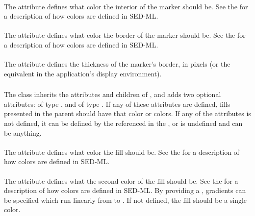 \begin{blockChanged}
\paragraph*{}

The  attribute defines what color the interior of the marker should be.  See the \ColorKind for a description of how colors are defined in SED-ML.

\paragraph*{}

The  attribute defines what color the border of the marker should be.  See the \ColorKind for a description of how colors are defined in SED-ML.

\paragraph*{}

The  attribute defines the thickness of the marker's border, in pixels (or the equivalent in the application's display environment).



\subsubsection{}
\label{class:fill}

The \Fill class inherits the attributes and children of \SedBase, and adds two optional attributes:  of type \ColorKind, and  of type \ColorKind.  If any of these attributes are defined, fills presented in the parent \Style should have that color or colors.  If any of the attributes is not defined, it can be defined by the \Style referenced in the , or is undefined and can be anything.

\paragraph*{}

The  attribute defines what color the fill should be.  See the \ColorKind for a description of how colors are defined in SED-ML.

\paragraph*{}

The  attribute defines what the second color of the fill should be.  See the \ColorKind for a description of how colors are defined in SED-ML.  By providing a , gradients can be specified which run linearly from  to .  If not defined, the fill should be a single color.




\end{blockChanged}

